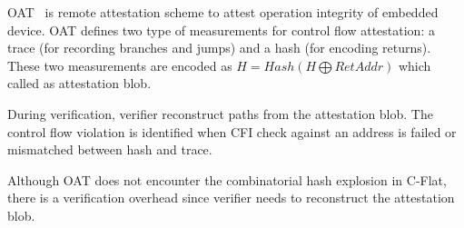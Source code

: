 OAT~\cite{sunOATAttestingOperation2020} is remote attestation scheme to attest
operation integrity of embedded device. OAT defines two type of measurements for
control flow attestation: a trace (for recording branches and jumps) and a hash
(for encoding returns). These two measurements are encoded as $H = Hash(H
\bigoplus RetAddr)$ which called as attestation blob.

During verification, verifier reconstruct paths from the attestation blob. The
control flow violation is identified when CFI check against an address is failed
or mismatched between hash and trace.

Although OAT does not encounter the combinatorial hash explosion in C-Flat,
there is a verification overhead since verifier needs to reconstruct the
attestation blob. 
